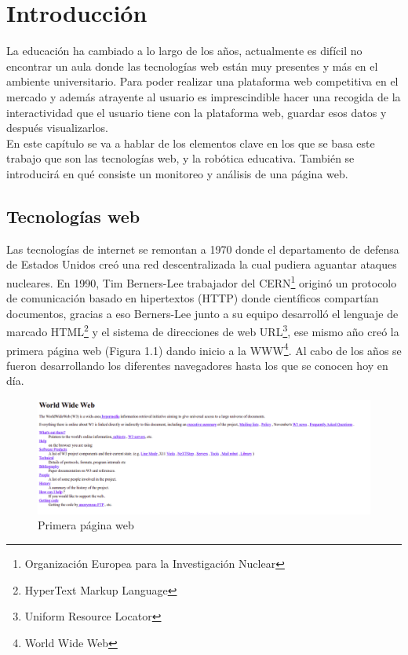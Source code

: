\chapter{Introducción}
\label{chap:introduccion} 
La educación ha cambiado a lo largo de los años, actualmente es difícil no encontrar un aula donde las tecnologías web están muy presentes y más en el ambiente universitario. Para poder realizar una plataforma web competitiva en el mercado y además atrayente al usuario es imprescindible hacer una recogida de la interactividad que el usuario tiene con la plataforma web, guardar esos datos y después visualizarlos.\\

En este capítulo se va a hablar de los elementos clave en los que se basa este trabajo que son las tecnologías web, y la robótica educativa. También se introducirá en qué consiste un monitoreo y análisis de una página web.



\section{Tecnologías web}\label{motivacion}
Las tecnologías de internet se remontan a 1970 donde el departamento de defensa de Estados Unidos creó una red descentralizada la cual pudiera aguantar ataques nucleares. En 1990, Tim Berners-Lee trabajador del CERN\footnote{Organización Europea para​ la Investigación Nuclear} originó un protocolo de comunicación basado en hipertextos (HTTP) donde científicos compartían documentos, gracias a eso Berners-Lee junto a su equipo desarrolló el lenguaje de marcado HTML\footnote{HyperText Markup Language} y el sistema de direcciones de web URL\footnote{Uniform Resource Locator}, ese mismo año creó la primera página web (Figura 1.1) dando inicio a la WWW\footnote{World Wide Web}. Al cabo de los años se fueron desarrollando los diferentes navegadores hasta los que se conocen hoy en día. \\

\begin{figure}[H]
    \centering
    \includegraphics[width=16cm, keepaspectratio]{img/first_web_page.png}
    \caption{Primera página web}
    \label{fig:web}
\end{figure}

